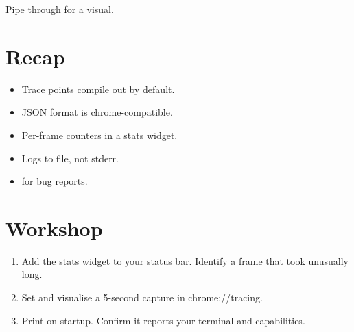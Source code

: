 Pipe through  for a visual.

\section{Recap}

\begin{recap}
\begin{itemize}[leftmargin=*]
  \item Trace points compile out by default.
  \item JSON format is chrome-compatible.
  \item Per-frame counters in a stats widget.
  \item Logs to file, not stderr.
  \item {} for bug reports.
\end{itemize}
\end{recap}

\section*{Workshop}

\begin{enumerate}[leftmargin=*]
  \item Add the stats widget to your status bar. Identify a
    frame that took unusually long.
  \item Set  and visualise a 5-second
    capture in chrome://tracing.
  \item Print  on startup. Confirm it
    reports your terminal and capabilities.
\end{enumerate}
